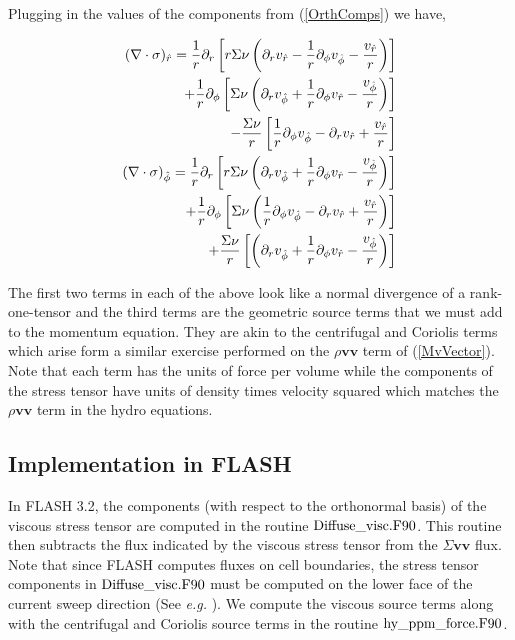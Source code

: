 Plugging in the values of the components from (\ref{OrthComps}) we have,
\begin{center}
\begin{align}
(\nabla \cdot \sigma)_{\hat{r}} = \frac{1}{r} \partial_{r} \left[ r \Sigma \nu \left(  \partial_r \vr - \frac{1}{r}\partial_{\phi} \vp  - \frac{\vr}{r} \right)   \right]  \nonumber \\
+ \frac{1}{r}\partial_{\phi} \left[  \Sigma \nu \left(  \partial_r \vp + \frac{1}{r}\partial_{\phi}\vr  - \frac{\vp}{r}  \right)   \right]  \nonumber \\
- \frac{\Sigma \nu}{r} \left[  \frac{1}{r} \partial_{\phi} \vp  -  \partial_r \vr +  \frac{\vr}{r} \right]  \nonumber \\
%
(\nabla \cdot \sigma)_{\hat{\phi}} = \frac{1}{r} \partial_{r} \left[ r \Sigma \nu \left( \partial_r \vp + \frac{1}{r}\partial_{\phi}\vr  - \frac{\vp}{r}  \right)   \right]  \nonumber \\
+ \frac{1}{r}\partial_{\phi} \left[ \Sigma \nu \left( \frac{1}{r} \partial_{\phi} \vp  -  \partial_r \vr +  \frac{\vr}{r} \right) \right]  \nonumber \\
+ \frac{\Sigma \nu}{r} \left[  \left( \partial_r \vp + \frac{1}{r}\partial_{\phi}\vr  - \frac{\vp}{r}   \right)   \right]  %
\label{Div_sig_Full}
\end{align}
\end{center}
The first two terms in each of the above look like a normal divergence of a rank-one-tensor and the third terms are the geometric source terms that we must add to the momentum equation. They are akin to the centrifugal and Coriolis terms which arise form a similar exercise performed on the $\rho \mathbf{v v}$ term of (\ref{MvVector}). Note that each term has the units of force per volume while the components of the stress tensor have units of density times velocity squared which matches the $\rho \mathbf{v v}$ term in the hydro equations.




\subsection{Implementation in FLASH}
In FLASH 3.2, the components (with respect to the orthonormal basis) of the viscous stress tensor are computed in the routine $\rm{Diffuse\_visc.F90}$. This routine then subtracts the flux indicated by the viscous stress tensor from the $\Sigma \mathbf{v v}$ flux. Note that since FLASH computes fluxes on cell boundaries, the stress tensor components in $\rm{Diffuse\_visc.F90}$ must be computed on the lower face of the current sweep direction (See \textit{e.g.} \citep{Edgar:2006}). We compute the viscous source terms along with the centrifugal and Coriolis source terms in the routine $\rm{hy\_ppm\_force.F90}$. 


